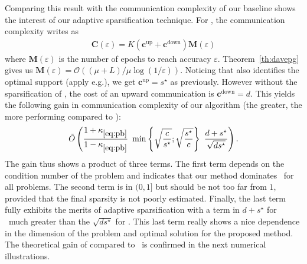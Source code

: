 Comparing this result with the communication complexity of our baseline \dave shows the interest of our adaptive sparsification technique. For \dave, the communication complexity writes as 
\begin{align*}%
    \mathbf{C}(\varepsilon) = K( \mathbf{c}^{\mathrm{up}} + \mathbf{c}^{\mathrm{down}} ) \mathbf{M}(\varepsilon) 
\end{align*}
where $\mathbf{M}(\varepsilon)$ is the number of epochs to reach accuracy $\varepsilon$. Theorem~\ref{th:davepg} gives us  $\mathbf{M}(\varepsilon) = \mathcal{O}((\mu+L)/\mu\log(1/\varepsilon))$. 
Noticing that \dave also identifies the optimal support (apply e.g.\;\cite[Cor.]{iutzeler2020SVAA}),
we get $\mathbf{c^{\mathrm{up}}} = s^\star$ as previously. However without the sparsification of \salgo, the cost of an upward communication is $\mathbf{c^{\mathrm{down}}} = d$. This yields the following gain in communication complexity of our algorithm %
(the greater, the more performing \recoalgo compared to \dave):
\begin{align*}
      \tilde{O}\left( \frac{1+\kappa_{\eqref{eq:pb}}}{1-\kappa_{\eqref{eq:pb}}}   ~ \min \left\{\sqrt{\frac{c}{s^\star}};\sqrt{\frac{s^\star}{c}} \right\} ~ \frac{d+s^\star}{\sqrt{ds^\star}}  \right).
\end{align*}
The gain thus shows a product of three terms. 
The first term depends on the condition number of the problem and indicates that our method dominates \dave~for all problems.
The second term is in $(0,1]$ but should be not too far from $1$, provided that the final sparsity is not poorly estimated. Finally, the last term fully exhibits the merits of adaptive sparsification with a term in $d + s^\star $ for \dave~much greater than the $\sqrt{ds^\star}$ for \recoalgo. This last term really shows a nice dependence in the dimension of the problem and optimal solution for the proposed method. The theoretical gain of \recoalgo compared to \dave~is confirmed in the next numerical illustrations.